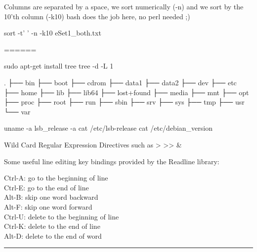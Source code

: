 \documentclass[11pt]{article}
\begin{document}
Columns are separated by a space, we sort numerically (-n) and we sort
by the 10'th column (-k10) bash does the job here, no perl needed ;)

sort -t' ' -n -k10 eSet1\_both.txt

======

sudo apt-get install tree tree -d -L 1

. ├── bin ├── boot ├── cdrom ├── data1 ├── data2 ├── dev ├── etc ├──
home ├── lib ├── lib64 ├── lost+found ├── media ├── mnt ├── opt ├── proc
├── root ├── run ├── sbin ├── srv ├── sys ├── tmp ├── usr └── var

uname -a lsb\_release -a cat /etc/lsb-release cat /etc/debian\_version

Wild Card Regular Expression Directives such as \textgreater{}
\textbar{} \textgreater{}\textgreater{} \&

Some useful line editing key bindings provided by the Readline library:

Ctrl-A: go to the beginning of line\\
Ctrl-E: go to the end of line\\
Alt-B: skip one word backward\\
Alt-F: skip one word forward\\
Ctrl-U: delete to the beginning of line\\
Ctrl-K: delete to the end of line\\
Alt-D: delete to the end of word

\begin{center}\rule{0.5\linewidth}{\linethickness}\end{center}
\end{document}
